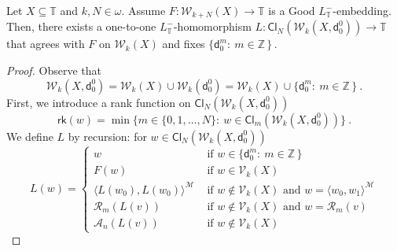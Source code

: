 \documentclass[10pt,a4paper]{amsart}
\begin{document}
\begin{lemma}   \label{SectionQNthClureLemma}
Let  $X \subseteq   \mathbb{T} $  and   $  k, N  \in  \omega $. 
Assume    $  F :  \mathcal{W}_{ k + N  }  \left(  X  \right)   \to   \mathbb{T}    $  is  a  \textsf{Good}  $  L_{  \mathbb{T} }^- $-embedding.
Then,  there  exists  a   one-to-one  $  L_{  \mathbb{T} }^-$-homomorphism   
 $  L:   \mathsf{Cl}_{N}  \left(  \mathcal{W}_{k}  \left( X  ,  \mathsf{d}^0_0 \right)   \right)   \to   \mathbb{T}   $
that agrees with  $  F  $  on     $  \mathcal{W}_{ k   }  \left(  X  \right)    $
and  fixes    $  \big\{   \mathsf{d}^m_0  :   \    m  \in  \mathbb{Z}   \,   \big\}     \,    $.
\end{lemma}

\begin{proof}


Observe that 
\[
\mathcal{W}_{k}  \left( X  ,  \mathsf{d}^0_0 \right)    
= 
  \mathcal{W}_{k}  \left( X   \right)    \cup     \mathcal{W}_{k}  \left(  \mathsf{d}^0_0   \right)  
= 
  \mathcal{W}_{k}  \left( X   \right)  
\cup   \big\{   \mathsf{d}^m_0  :   \    m  \in  \mathbb{Z}   \,   \big\}
\        .
\]
First,  we  introduce a rank function on   $ \mathsf{Cl}_{N}  \left(  \mathcal{W}_{k}  \left( X ,  \mathsf{d}^0_0   \right)   \right)    $
\[
\mathsf{rk}  \left(  w  \right)   =  \min  
\big\{  m  \in  \lbrace 0, 1,  \ldots ,  N  \rbrace  :   \  
 w  \in  \mathsf{Cl}_{m}  \left(  \mathcal{W}_{k}  \left( X ,   \mathsf{d}^0_0    \right)   \right)     \big\}  
\     .
\]
We define  $L$ by recursion:   for  $  w  \in      \mathsf{Cl}_{N}  \left(  \mathcal{W}_{k}  \left( X  ,   \mathsf{d}^0_0    \right)   \right)     $
\[
L  \left(  w  \right)   =   \begin{cases}
w            &   \mbox{  if   }     w  \in    \big\{   \mathsf{d}^m_0  :   \    m  \in  \mathbb{Z}   \,   \big\} 
\\
F ( w)      &     \mbox{  if   }   w  \in    \mathcal{V}_{ k  }  \left(  X  \right) 
\\
\langle  L(w_0),   L(w_0 )   \rangle^{   \mathcal{M}  }      &    \mbox{  if  }  w  \not\in   \mathcal{V}_{ k  }  \left(  X  \right)   
                     \mbox{  and   }    w  =  \langle  w_0,  w_1    \rangle^{   \mathcal{M}  }  
\\
\mathcal{R}_m  \left(   L(v)  \right)      &    \mbox{  if  }  w  \not\in   \mathcal{V}_{ k  }  \left(  X  \right)   
                     \mbox{  and   }      w  =       \mathcal{R}_m  \left(   v \right)    
\\
\mathcal{A}_n  \left(   L(v)  \right)      &    \mbox{  if  }  w  \not\in   \mathcal{V}_{ k  }  \left(  X  \right)   

\end{cases}\]
\end{proof}
\end{document}
